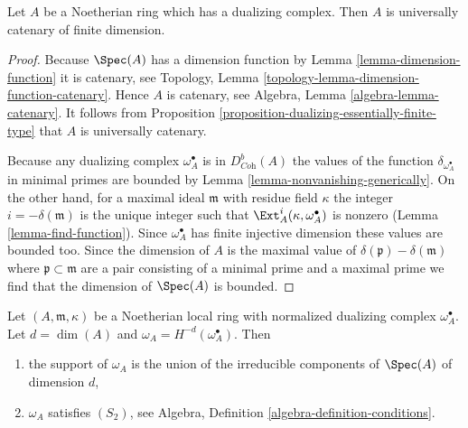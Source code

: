 \begin{lemma}
\label{lemma-universally-catenary}
Let $A$ be a Noetherian ring which has a dualizing
complex. Then $A$ is universally catenary of finite dimension.
\end{lemma}

\begin{proof}
Because $\Spec(A)$ has a dimension function by
Lemma \ref{lemma-dimension-function}
it is catenary, see
Topology, Lemma \ref{topology-lemma-dimension-function-catenary}.
Hence $A$ is catenary, see
Algebra, Lemma \ref{algebra-lemma-catenary}.
It follows from
Proposition \ref{proposition-dualizing-essentially-finite-type}
that $A$ is universally catenary.

\medskip\noindent
Because any dualizing complex $\omega_A^\bullet$ is
in $D^b_{\textit{Coh}}(A)$ the values of the function
$\delta_{\omega_A^\bullet}$ in minimal primes are bounded by
Lemma \ref{lemma-nonvanishing-generically}.
On the other hand, for a maximal ideal $\mathfrak m$ with
residue field $\kappa$ the integer $i = -\delta(\mathfrak m)$
is the unique integer such that
$\Ext_A^i(\kappa, \omega_A^\bullet)$ is nonzero
(Lemma \ref{lemma-find-function}).
Since $\omega_A^\bullet$ has finite injective dimension
these values are bounded too. Since the dimension of
$A$ is the maximal value of $\delta(\mathfrak p) - \delta(\mathfrak m)$
where $\mathfrak p \subset \mathfrak m$ are a pair
consisting of a minimal prime and a maximal prime we find that the
dimension of $\Spec(A)$ is bounded.
\end{proof}

\begin{lemma}
\label{lemma-depth-dualizing-module}
Let $(A, \mathfrak m, \kappa)$ be a Noetherian local ring with
normalized dualizing complex $\omega_A^\bullet$. Let $d = \dim(A)$
and $\omega_A = H^{-d}(\omega_A^\bullet)$. Then
\begin{enumerate}
\item the support of $\omega_A$ is the union of the irreducible components
of $\Spec(A)$ of dimension $d$,
\item $\omega_A$ satisfies $(S_2)$, see
Algebra, Definition \ref{algebra-definition-conditions}.
\end{enumerate}
\end{lemma}

